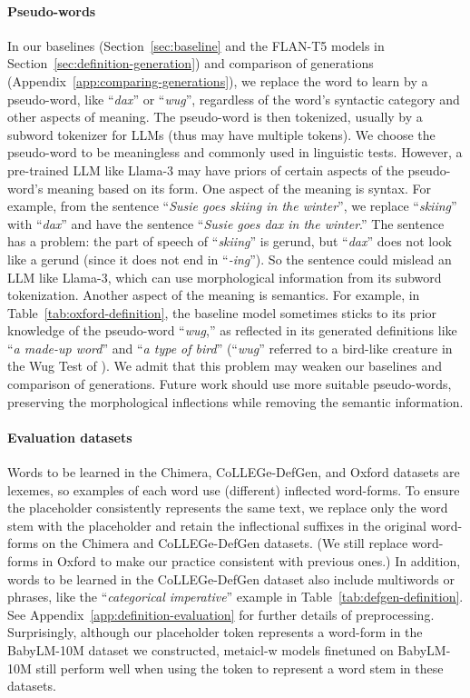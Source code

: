 \documentclass{article}
\begin{document}
\paragraph{Pseudo-words}
In our baselines (Section~\ref{sec:baseline} and the \mbox{FLAN-T5} models in Section~\ref{sec:definition-generation}) and comparison of generations (Appendix~\ref{app:comparing-generations}), we replace the word to learn by a pseudo-word, like ``\emph{dax}'' or ``\emph{wug}'', regardless of the word's syntactic category and other aspects of meaning.
The pseudo-word is then tokenized, usually by a subword tokenizer for LLMs (thus may have multiple tokens).
We choose the pseudo-word to be meaningless and commonly used in linguistic tests.
However, a pre-trained LLM like \mbox{Llama-3} may have priors of certain aspects of the pseudo-word's meaning based on its form.
One aspect of the meaning is syntax.
For example, from the sentence ``\emph{Susie goes skiing in the winter}'', we replace ``\emph{skiing}'' with ``\emph{dax}'' and have the sentence ``\emph{Susie goes dax in the winter}.'' The sentence has a problem: the part of speech of ``\emph{skiing}'' is gerund, but ``\emph{dax}'' does not look like a gerund (since it does not end in ``\emph{-ing}''). So the sentence could mislead an LLM like \mbox{Llama-3}, which can use morphological information from its subword tokenization.
Another aspect of the meaning is semantics.
For example, in Table~\ref{tab:oxford-definition}, the baseline model sometimes sticks to its prior knowledge of the pseudo-word ``\emph{wug},'' as reflected in its generated definitions like ``\emph{a made-up word}'' and ``\emph{a type of bird}'' (``\emph{wug}'' referred to a bird-like creature in the Wug Test of \citealp{Berko1958TheCL}).
We admit that this problem may weaken our baselines and comparison of generations.
Future work should use more suitable pseudo-words, preserving the morphological inflections while removing the semantic information.

\paragraph{Evaluation datasets}
Words to be learned in the Chimera, CoLLEGe-DefGen, and Oxford datasets are lexemes, so examples of each word use (different) inflected word-forms.
To ensure the placeholder consistently represents the same text, we replace only the word stem with the placeholder and retain the inflectional suffixes in the original word-forms on the Chimera and CoLLEGe-DefGen datasets. (We still replace word-forms in Oxford to make our practice consistent with previous ones.)
In addition, words to be learned in the CoLLEGe-DefGen dataset also include multiwords or phrases, like the ``\emph{categorical imperative}'' example in Table~\ref{tab:defgen-definition}.
See Appendix~\ref{app:definition-evaluation} for further details of preprocessing.
Surprisingly, although our placeholder token represents a word-form in the \mbox{BabyLM-10M} dataset we constructed, \ac{metaicl-w} models finetuned on \mbox{BabyLM-10M} still perform well when using the token to represent a word stem in these datasets.

\end{document}
